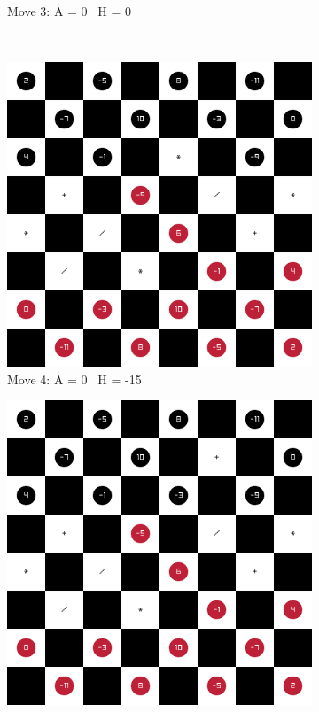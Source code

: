 \begin{figure}[H]
\begin{subfigure}{0.3\textwidth}
        \caption*{Move 3: A = 0 \textbar\ H = 0}
    \end{subfigure} \\
    \begin{subfigure}{0.3\textwidth}
        \centering
        \includegraphics[width=\textwidth]{images/games/game1/move_5.png}
        \caption*{Move 4: A = 0 \textbar\ H = -15}
    \end{subfigure}
    \quad
    \begin{subfigure}{0.3\textwidth}
        \centering
        \includegraphics[width=\textwidth]{images/games/game1/move_6.png}

\end{subfigure}
\end{figure}
